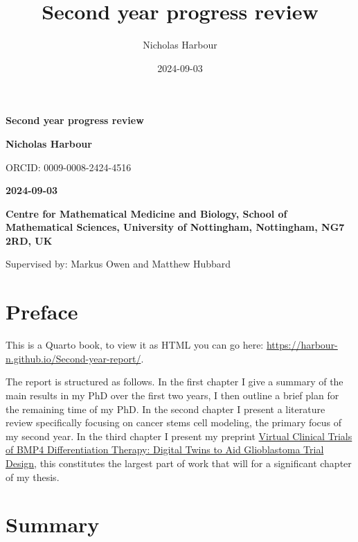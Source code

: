 \documentclass[
  letterpaper,
]{scrreprt}
\title{Second year progress review}
\author{Nicholas Harbour}
\date{2024-09-03}
\renewcommand*\contentsname{Table of contents}
\newcommand\contentsname{Table of contents}
\theoremstyle{definition}
\theoremstyle{remark}
\begin{document}
\cleardoublepage
\thispagestyle{empty}
{\centering
{\Huge\bfseries Second year progress review \par}
\vspace{12ex}
{\Large\bfseries Nicholas Harbour \par}
\vspace{3ex}
{\Large ORCID: 0009-0008-2424-4516 \par}
{\bfseries\large 2024-09-03 \par}
\vspace{12ex}
%
%
{\bfseries\large Centre for Mathematical Medicine and Biology, School of
Mathematical Sciences, University of Nottingham, Nottingham, NG7 2RD,
UK \par}
%
\vspace{12ex}
{\small Supervised by: Markus Owen and Matthew Hubbard\par}
}

\renewcommand*\contentsname{Table of contents}
{
\hypersetup{linkcolor=}
\setcounter{tocdepth}{2}
\tableofcontents
}


\chapter*{Preface}\label{preface}


This is a Quarto book, to view it as HTML you can go here:
\url{https://harbour-n.github.io/Second-year-report/}.

The report is structured as follows. In the first chapter I give a
summary of the main results in my PhD over the first two years, I then
outline a brief plan for the remaining time of my PhD. In the second
chapter I present a literature review specifically focusing on cancer
stems cell modeling, the primary focus of my second year. In the third
chapter I present my preprint
\href{https://www.biorxiv.org/content/10.1101/2024.08.22.609156v1.abstract}{Virtual
Clinical Trials of BMP4 Differentiation Therapy: Digital Twins to Aid
Glioblastoma Trial Design}, this constitutes the largest part of work
that will for a significant chapter of my thesis.


\chapter{Summary}\label{summary}
\end{document}
